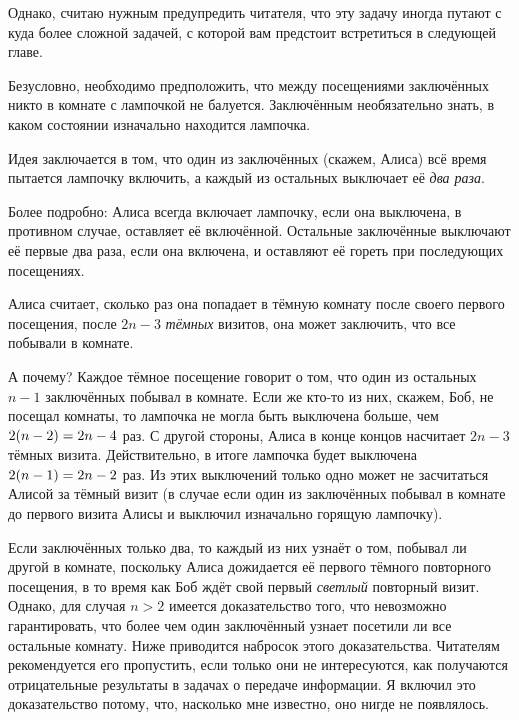Однако, считаю нужным предупредить читателя, что эту задачу иногда путают с куда более сложной задачей, с которой вам предстоит встретиться в следующей главе.

\medskip

Безусловно, необходимо предположить, что между посещениями заключённых никто в комнате с лампочкой не балуется.
Заключённым необязательно знать, в каком состоянии изначально находится лампочка.

{

\sloppy

Идея заключается в том, что один из заключённых (скажем, Алиса) всё время пытается лампочку включить, а каждый из остальных выключает её \emph{два раза}.

}

Более подробно: Алиса всегда включает лампочку, если она выключена, в противном случае, оставляет её включённой.
Остальные заключённые выключают её первые два раза, если она включена, и оставляют её гореть при последующих посещениях.

Алиса считает, сколько раз она попадает в тёмную комнату после своего первого 
посещения, после $2n-3$ \emph{тёмных} визитов, она может заключить, что все побывали в комнате.

А почему?
Каждое тёмное посещение говорит о том, что один из остальных $n-1$ заключённых побывал в комнате.
Если же кто-то из них, скажем, Боб, не посещал комнаты, то лампочка не могла быть выключена больше, чем $2(n-2)\z=2n-4$ раз.
С другой стороны, Алиса в конце концов насчитает $2n-3$ тёмных визита.
Действительно, в итоге лампочка будет выключена $2(n-1)\z=2n-2$
раз.
Из этих выключений только одно может не засчитаться Алисой за тёмный визит (в случае если один из заключённых побывал в комнате до первого визита Алисы и выключил изначально горящую лампочку).

Если заключённых только два, то каждый из них узнаёт о том, побывал ли другой в комнате, поскольку Алиса дожидается её первого тёмного повторного посещения, в то время как Боб ждёт свой первый \emph{светлый} повторный визит.
Однако, для случая $n>2$ имеется доказательство того, что невозможно гарантировать, что более чем один заключённый узнает посетили ли все остальные комнату.
Ниже приводится набросок этого доказательства.
Читателям рекомендуется его пропустить, если только они не интересуются, как получаются отрицательные результаты в задачах о передаче информации.
Я включил это доказательство потому, что, насколько мне известно, оно нигде не появлялось.

